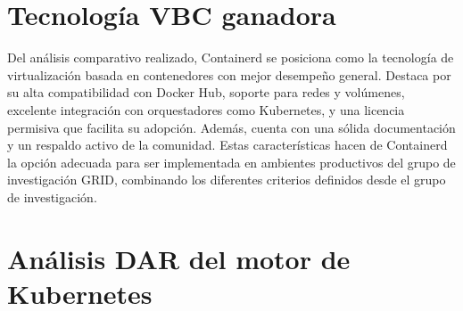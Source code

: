 \section{Tecnología VBC ganadora}

Del análisis comparativo realizado, Containerd se posiciona como la tecnología de virtualización basada en contenedores con mejor desempeño general. Destaca por su alta compatibilidad con Docker Hub, soporte para redes y volúmenes, excelente integración con orquestadores como Kubernetes, y una licencia permisiva que facilita su adopción. Además, cuenta con una sólida documentación y un respaldo activo de la comunidad. Estas características hacen de Containerd la opción adecuada para ser implementada en ambientes productivos del grupo de investigación GRID, combinando los diferentes criterios definidos desde el grupo de investigación.

\section{Análisis DAR del motor de Kubernetes}

